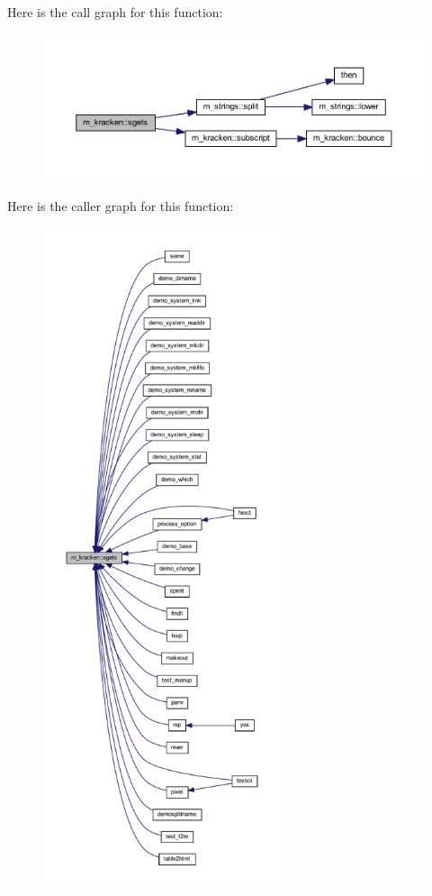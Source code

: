 Here is the call graph for this function\+:
\nopagebreak
\begin{figure}[H]
\begin{center}
\leavevmode
\includegraphics[width=350pt]{namespacem__kracken_a8ae60c1a9c903c8ad06ef1f95975d457_cgraph}
\end{center}
\end{figure}
Here is the caller graph for this function\+:
\nopagebreak
\begin{figure}[H]
\begin{center}
\leavevmode
\includegraphics[height=550pt]{namespacem__kracken_a8ae60c1a9c903c8ad06ef1f95975d457_icgraph}
\end{center}
\end{figure}
\mbox{\label{namespacem__kracken_ae1bb0ffb2cd28ae8cc8fade9f1988c3c}} 
